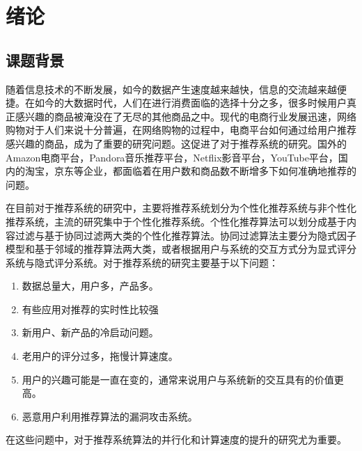\chapter{绪论}
%
%
%
%
%



\section{课题背景}
随着信息技术的不断发展，如今的数据产生速度越来越快，信息的交流越来越便捷。在如今的大数据时代，人们在进行消费面临的选择十分之多，很多时候用户真正感兴趣的商品被淹没在了无尽的其他商品之中。现代的电商行业发展迅速，网络购物对于人们来说十分普遍，在网络购物的过程中，电商平台如何通过给用户推荐感兴趣的商品，成为了重要的研究问题。这促进了对于推荐系统的研究。国外的Amazon电商平台\cite{Linden:2003kc}，Pandora音乐推荐平台，Netflix影音平台，YouTube平台\cite{Davidson:2010hg}，国内的淘宝，京东等企业，都面临着在用户数和商品数不断增多下如何准确地推荐的问题。

在目前对于推荐系统的研究中，主要将推荐系统划分为个性化推荐系统与非个性化推荐系统，主流的研究集中于个性化推荐系统。个性化推荐算法可以划分成基于内容过滤与基于协同过滤两大类的个性化推荐算法。协同过滤算法主要分为隐式因子模型和基于邻域的推荐算法两大类，或者根据用户与系统的交互方式分为显式评分系统与隐式评分系统。对于推荐系统的研究主要基于以下问题：
\begin{enumerate}
    \item  数据总量大，用户多，产品多。
    \item 有些应用对推荐的实时性比较强
    \item 新用户、新产品的冷启动问题。
    \item 老用户的评分过多，拖慢计算速度。
    \item  用户的兴趣可能是一直在变的，通常来说用户与系统新的交互具有的价值更高。
    \item 恶意用户利用推荐算法的漏洞攻击系统。
 \end{enumerate}
 在这些问题中，对于推荐系统算法的并行化和计算速度的提升的研究尤为重要。
 
